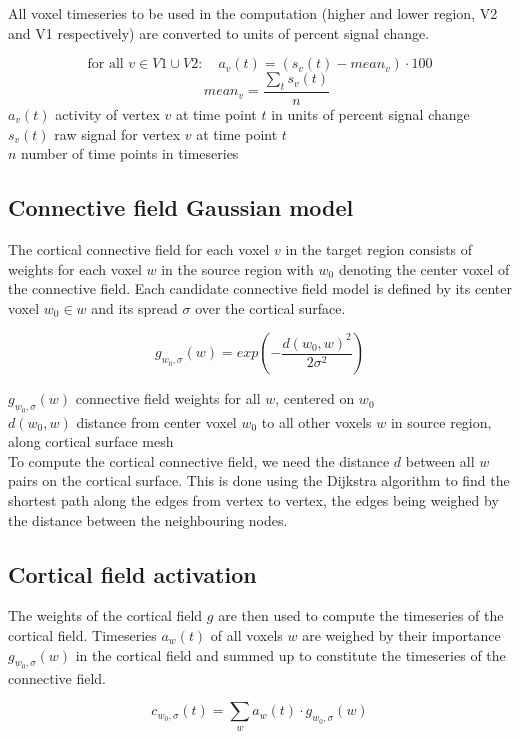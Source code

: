 \documentclass[biblatex]{lni}
\begin{document}
All voxel timeseries to be used in the computation (higher and lower region, V2 and V1 respectively) are converted to units of percent signal change.

\[\textrm{for all } v \in V1 \cup V2:\quad a_v(t)=(s_v(t)-mean_v) \cdot 100\] 
\[\quad mean_v=\frac{\sum_{t} s_v(t)}{ n}\]
$a_v(t)$ activity of vertex $v$ at time point $t$ in units of percent signal change \\
$s_v(t)$ raw signal for vertex $v$ at time point $t$ \\
$n$ number of time points in timeseries\\

\subsection{Connective field Gaussian model}
The cortical connective field for each voxel $v$ in the target region consists of weights for each voxel $w$ in the source region with $w_0$ denoting the center voxel of the connective field. Each candidate connective field model is defined by its center voxel $w_0 \in {w}$ and its spread $\sigma$ over the cortical surface.

\[g_{w_0,\sigma}(w)=exp(-\frac{d(w_0,w)^2}{2\sigma^2})\]

$g_{w_0,\sigma}(w)$ connective field weights for all $w$, centered on $w_0$  \\
$d(w_0,w)$ distance from center voxel $w_0$ to all other voxels $w$ in source region, along cortical surface mesh\\

To compute the cortical connective field, we need the distance $d$ between all $w$ pairs on the cortical surface. This is done using the Dijkstra algorithm to find the shortest path along the edges from vertex to vertex, the edges being weighed by the distance between the neighbouring nodes. 

\subsection{Cortical field activation}
The weights of the cortical field $g$ are then used to compute the timeseries of the cortical field. Timeseries $a_w(t)$ of all voxels $w$ are weighed by their importance $g_{w_0,\sigma}(w)$ in the cortical field and summed up to constitute the timeseries of the connective field.

\[c_{w_0,\sigma}(t)=\sum_{w} a_w(t) \cdot g_{w_0,\sigma}(w)\]
\end{document}
